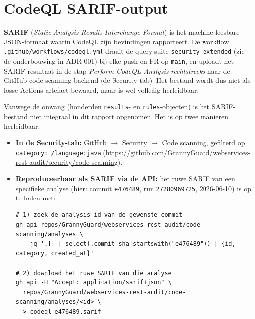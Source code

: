 \documentclass[12pt, a4paper]{report}
\begin{document}
\newpage

\appendix

\chapter{CodeQL SARIF-output}
\label{app:codeql}

\textbf{SARIF} (\emph{Static Analysis Results Interchange Format}) is het
machine-leesbare JSON-formaat waarin CodeQL zijn bevindingen rapporteert. De
workflow \texttt{.github/workflows/codeql.yml} draait de query-suite
\texttt{security-extended} (zie de onderbouwing in ADR-001) bij elke push en PR
op \texttt{main}, en uploadt het SARIF-resultaat in de stap \emph{Perform CodeQL
Analysis} \emph{rechtstreeks} naar de GitHub code-scanning-backend (de
Security-tab). Het bestand wordt dus niet als losse Actions-artefact bewaard,
maar is wel volledig herleidbaar.

Vanwege de omvang (honderden \texttt{results}- en \texttt{rules}-objecten) is het
SARIF-bestand niet integraal in dit rapport opgenomen. Het is op twee manieren
herleidbaar:

\begin{itemize}
    \item \textbf{In de Security-tab:} GitHub $\to$ Security $\to$ Code scanning,
          gefilterd op \texttt{category: /language:java}
          (\url{https://github.com/GrannyGuard/webservices-rest-audit/security/code-scanning}).
    \item \textbf{Reproduceerbaar als SARIF via de API:} het ruwe SARIF van een
          specifieke analyse (hier: commit \texttt{e476489}, run
          \texttt{27280969725}, 2026-06-10) is op te halen met:
\begin{lstlisting}[basicstyle=\ttfamily\scriptsize, breaklines=true, frame=single]
# 1) zoek de analysis-id van de gewenste commit
gh api repos/GrannyGuard/webservices-rest-audit/code-scanning/analyses \
  --jq '.[] | select(.commit_sha|startswith("e476489")) | {id, category, created_at}'

# 2) download het ruwe SARIF van die analyse
gh api -H "Accept: application/sarif+json" \
  repos/GrannyGuard/webservices-rest-audit/code-scanning/analyses/<id> \
  > codeql-e476489.sarif
\end{lstlisting}
\end{itemize}
\end{document}
